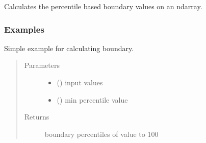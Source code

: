 \documentclass[letterpaper,10pt,english,openany,oneside]{sphinxmanual}
\begin{document}
\begin{fulllineitems}

\begin{fulllineitems}
\label{\detokenize{docs/source/preprocess:preprocess.preprocess_tools.Scaler.calc_boundary}}
Calculates the percentile based boundary values on an ndarray.
\subsubsection*{Examples}

Simple example for calculating boundary.

\begin{sphinxVerbatim}[commandchars=\\\{\}]
  \PYG{p}{[}\PYG{p}{[}    \PYG{p}{]}\PYG{p}{[}    \PYG{p}{]}\PYG{p}{]}
  
 
\end{sphinxVerbatim}
\begin{quote}\begin{description}
\item[{Parameters}] \leavevmode\begin{itemize}
\item {} 
 () \textendash{} input values

\item {} 
 () \textendash{} min percentile value

\end{itemize}

\item[{Returns}] \leavevmode
boundary percentiles of value  to 100


\end{description}
\end{quote}
\end{fulllineitems}
\end{fulllineitems}
\end{document}
